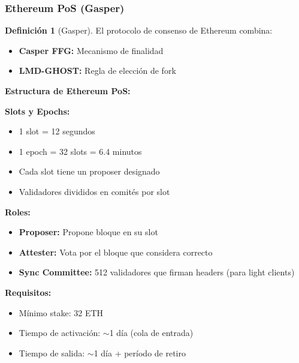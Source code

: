 \documentclass[11pt,a4paper,twoside,openright]{book}
\theoremstyle{definition}
\newtheorem{definition}{Definición}[chapter]
\theoremstyle{plain}
\theoremstyle{remark}
\begin{document}
\subsubsection{Ethereum PoS (Gasper)}

\begin{definition}[Gasper]
El protocolo de consenso de Ethereum combina:
\begin{itemize}
    \item \textbf{Casper FFG:} Mecanismo de finalidad
    \item \textbf{LMD-GHOST:} Regla de elección de fork
\end{itemize}
\end{definition}

\begin{mathnote}
\textbf{Estructura de Ethereum PoS:}

\textbf{Slots y Epochs:}
\begin{itemize}
    \item 1 slot = 12 segundos
    \item 1 epoch = 32 slots = 6.4 minutos
    \item Cada slot tiene un proposer designado
    \item Validadores divididos en comités por slot
\end{itemize}

\textbf{Roles:}
\begin{itemize}
    \item \textbf{Proposer:} Propone bloque en su slot
    \item \textbf{Attester:} Vota por el bloque que considera correcto
    \item \textbf{Sync Committee:} 512 validadores que firman headers (para light clients)
\end{itemize}

\textbf{Requisitos:}
\begin{itemize}
    \item Mínimo stake: 32 ETH
    \item Tiempo de activación: $\sim$1 día (cola de entrada)
    \item Tiempo de salida: $\sim$1 día + período de retiro
\end{itemize}
\end{mathnote}
\end{document}
